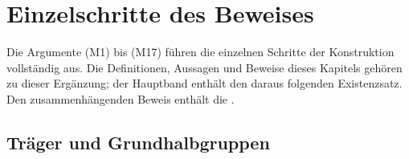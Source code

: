 \chapter{Einzelschritte des Beweises}

Die Argumente \textup{(M1)} bis \textup{(M17)} führen die einzelnen
Schritte der Konstruktion vollständig aus. Die Definitionen, Aussagen
und Beweise dieses Kapitels gehören zu dieser Ergänzung; der Hauptband
enthält den daraus folgenden Existenzsatz.
Den zusammenhängenden Beweis enthält die \MogReadingLink{}.

\section{Träger und Grundhalbgruppen}




